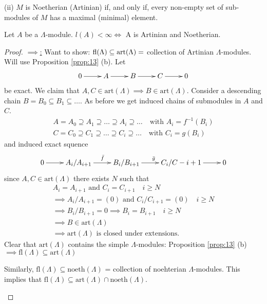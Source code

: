 \noindent (ii) \(M\) is Noetherian (Artinian) if, and only if, every
non-empty set of sub-modules of \(M\) has a maximal (minimal)
element. 

\begin{prop}\label{prop:14}
Let $A$ be a \(\Lambda\)-module. \(l(A) < \infty \Leftrightarrow\) A
is  Artinian and Noetherian. 
\end{prop}
\begin{proof}\underline{\(\implies\):} Want to show: \(\operatorname{fl}\nolimits(\Lambda)
  \subseteq \text{art}(\Lambda) = \) collection of Artinian
  \(\Lambda\)-modules. Will use Proposition \ref{prop:13}
  (b). Let  
\begin{align*}
    \xymatrix{0\ar[r] & A\ar[r] & B\ar[r] & C\ar[r] & 0}
\end{align*}
be exact. We claim that \(A, C\in\text{art}(\Lambda) \implies B\in\text{art}(\Lambda)\). Consider a descending chain \( B = B_0 \subseteq B_1 \subseteq \dots\). As before we get induced chains of submodules in \(A\) and \(C\). 
\begin{gather*}
    A = A_0 \supseteq A_1 \supseteq\dots\supseteq A_i\supseteq\dots\quad\text{with } A_i = f^{-1}(B_i)\\
    C = C_0 \supseteq C_1 \supseteq\dots\supseteq C_i\supseteq\dots\quad\text{with } C_i = g(B_i)
\end{gather*}
and induced exact squence
\begin{align*}
    \xymatrix{0\ar[r] & A_i/A_{i+1}\ar[r]^{\bar{f}} & B_i/B_{i+1}\ar[r]^{\bar{g}} & C_i/C-{i+1}\ar[r] & 0}
\end{align*}
since \(A, C\in\text{art}(\Lambda)\) there exists \(N\) such that
\begin{gather*}
A_i = A_{i+1} \text{ and } C_i = C_{i+1}\quad i\geq N\\
\implies A_i/A_{i+1} = (0) \text{ and } C_i/C_{i+1} = (0) \quad i \geq N \\
\implies B_i/B_{i+1} = 0 \implies B_i = B_{i+1} \quad i\geq N\\
\implies B\in\text{art}(\Lambda) \\
\implies \text{art}(\Lambda) \text{ is closed under extensions.}
\end{gather*}
Clear that \(\text{art}(\Lambda)\) contains the simple
\(\Lambda\)-modules: Proposition \ref{prop:13} (b)\(\implies  \text{fl}(\Lambda)\subseteq\text{art}(\Lambda)\)

\noindent\begin{exer} Similarly,
  \(\text{fl}(\Lambda)\subseteq\text{noeth}(\Lambda)\) = collection of
  noehterian \(\Lambda\)-modules. This implies that
  \(\text{fl}(\Lambda)\subseteq\text{art}(\Lambda)\cap\text{noeth}(\Lambda)\).
\end{exer}


\end{proof}
